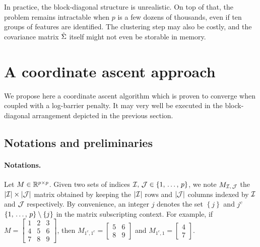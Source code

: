 \bigbreak
In practice, the block-diagonal structure is unrealistic.
On top of that, the problem remains intractable when $p$ is a few dozens of thousands,
even if ten groups of features are identified.
The clustering step may also be costly,
and the covariance matrix $\hat{\Sigma}$ itself might not even be storable in memory.

\section{A coordinate ascent approach}\label{sec:coordinate_ascent}

We propose here a coordinate ascent algorithm which is proven to converge when coupled with a log-barrier penalty.
It may very well be executed in the block-diagonal arrangement depicted in the previous section.

\subsection{Notations and preliminaries}\label{subsec:notations_preliminaries}

\paragraph{Notations.}
Let $M \in \mathbb{R}^{p \times p}$.
Given two sets of indices $\mathcal{I},\, \mathcal{J} \in \left\{ 1,\, \dots,\, p \right\}$,
we note $M_{\mathcal{I},\,\mathcal{J}}$ the $\left\lvert\mathcal{I}\right\rvert \times \left\lvert\mathcal{J}\right\rvert$ matrix obtained by keeping
the $\left\lvert\mathcal{I}\right\rvert$ rows and $\left\lvert\mathcal{J}\right\rvert$ columns indexed by $\mathcal{I}$ and $\mathcal{J}$ respectively.
By convenience, an integer $j$ denotes the set $\left\{ j \right\}$ and $j^c$ $\left\{ 1,\, \dots,\, p \right\} \setminus \left\{ j \right\}$
in the matrix subscripting context.
For example, if $M = \begin{bmatrix}
    1 & 2 & 3\\
    4 & 5 & 6\\
    7 & 8 & 9
\end{bmatrix}$,
then $M_{1^c, 1^c} = \begin{bmatrix}
    5 & 6\\
    8 & 9
\end{bmatrix}$
and $M_{1^c, 1} = \begin{bmatrix}
    4\\
    7
\end{bmatrix}$.


